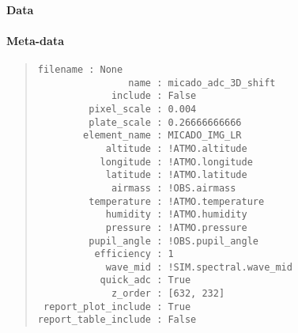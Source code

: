 \paragraph{Data%
  \label{id1}%
}


\paragraph{Meta-data%
  \label{id2}%
}

\begin{quote}
\begin{alltt}
\begin{lstlisting}[frame=single]
            filename : None
                name : micado_adc_3D_shift
             include : False
         pixel_scale : 0.004
         plate_scale : 0.26666666666
        element_name : MICADO_IMG_LR
            altitude : !ATMO.altitude
           longitude : !ATMO.longitude
            latitude : !ATMO.latitude
             airmass : !OBS.airmass
         temperature : !ATMO.temperature
            humidity : !ATMO.humidity
            pressure : !ATMO.pressure
         pupil_angle : !OBS.pupil_angle
          efficiency : 1
            wave_mid : !SIM.spectral.wave_mid
           quick_adc : True
             z_order : [632, 232]
 report_plot_include : True
report_table_include : False
\end{lstlisting}
\end{alltt}
\end{quote}
